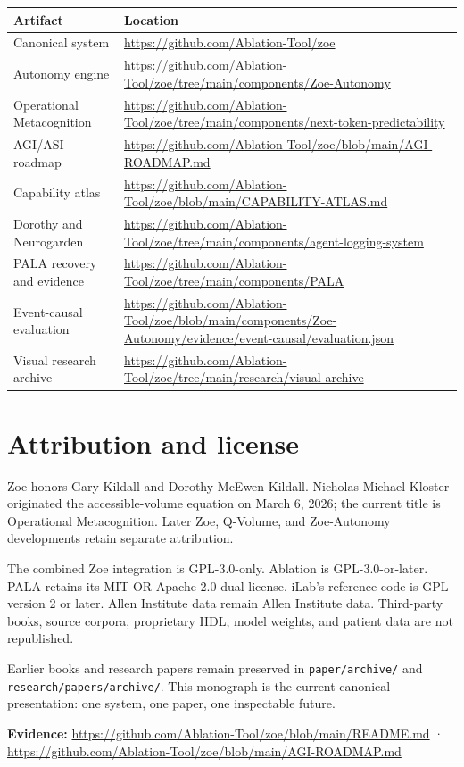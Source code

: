 \documentclass[11pt]{article}
\newcommand{\evidence}[1]{\par\smallskip\small\color{ZoeGray}\textbf{Evidence:} #1\normalsize\par\smallskip}
\begin{document}
\begin{longtable}{p{}p{}}
\toprule
\textbf{Artifact} & \textbf{Location}\\
\midrule
Canonical system & \url{https://github.com/Ablation-Tool/zoe}\\
Autonomy engine & \url{https://github.com/Ablation-Tool/zoe/tree/main/components/Zoe-Autonomy}\\
Operational Metacognition & \url{https://github.com/Ablation-Tool/zoe/tree/main/components/next-token-predictability}\\
AGI/ASI roadmap & \url{https://github.com/Ablation-Tool/zoe/blob/main/AGI-ROADMAP.md}\\
Capability atlas & \url{https://github.com/Ablation-Tool/zoe/blob/main/CAPABILITY-ATLAS.md}\\
Dorothy and Neurogarden & \url{https://github.com/Ablation-Tool/zoe/tree/main/components/agent-logging-system}\\
PALA recovery and evidence & \url{https://github.com/Ablation-Tool/zoe/tree/main/components/PALA}\\
Event-causal evaluation & \url{https://github.com/Ablation-Tool/zoe/blob/main/components/Zoe-Autonomy/evidence/event-causal/evaluation.json}\\
Visual research archive & \url{https://github.com/Ablation-Tool/zoe/tree/main/research/visual-archive}\\
\bottomrule
\end{longtable}

\clearpage
\section{Attribution and license}

Zoe honors Gary Kildall and Dorothy McEwen Kildall. Nicholas Michael Kloster originated the accessible-volume equation on March 6, 2026; the current title is Operational Metacognition. Later Zoe, Q-Volume, and Zoe-Autonomy developments retain separate attribution.

The combined Zoe integration is GPL-3.0-only. Ablation is GPL-3.0-or-later. PALA retains its MIT OR Apache-2.0 dual license. iLab's reference code is GPL version 2 or later. Allen Institute data remain Allen Institute data. Third-party books, source corpora, proprietary HDL, model weights, and patient data are not republished.

Earlier books and research papers remain preserved in \texttt{paper/archive/} and \texttt{research/papers/archive/}. This monograph is the current canonical presentation: one system, one paper, one inspectable future.

\evidence{\url{https://github.com/Ablation-Tool/zoe/blob/main/README.md} · \url{https://github.com/Ablation-Tool/zoe/blob/main/AGI-ROADMAP.md}}
\end{document}
